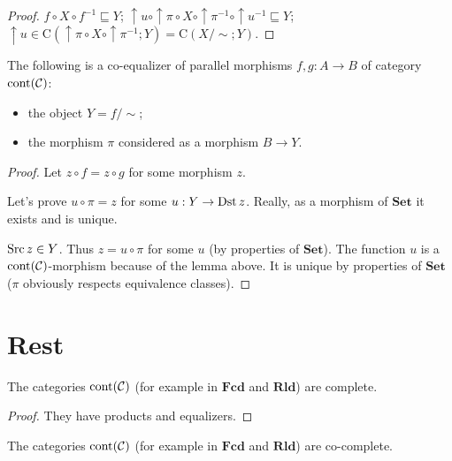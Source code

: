 \begin{proof}
  $f \circ X \circ f^{- 1} \sqsubseteq Y$; $\uparrow u \circ \uparrow \pi
  \circ X \circ \uparrow \pi^{- 1} \circ \uparrow u^{- 1} \sqsubseteq Y$;
  $\uparrow u \in \mathrm{C} (\uparrow \pi \circ X \circ \uparrow \pi^{- 1} ;
  Y) = \mathrm{C} (X / \sim ; Y)$.
\end{proof}

\begin{thm}
  The following is a co-equalizer of parallel morphisms $f, g : A \rightarrow
  B$ of category $\operatorname{cont} (\mathcal{C})$:
  \begin{itemize}
    \item the object $Y = f / \sim$;
    
    \item the morphism $\pi$ considered as a morphism $B \rightarrow Y$.
  \end{itemize}
\end{thm}

\begin{proof}
  Let $z \circ f = z \circ g$ for some morphism $z$.
  
  Let's prove $u \circ \pi = z$ for some $u : Y \rightarrow \operatorname{Dst} z$.
  Really, as a morphism of $\mathbf{Set}$ it exists and is unique.
  
  $\operatorname{Src} z \in Y$. Thus $z = u \circ \pi$ for some $u$ (by properties of
  $\mathbf{Set}$). The function $u$ is a $\operatorname{cont}
  (\mathcal{C})$-morphism because of the lemma above. It is unique by
  properties of $\mathbf{Set}$ ($\pi$ obviously respects equivalence
  classes).
\end{proof}

\section{Rest}

\begin{thm}
  The categories $\operatorname{cont} (\mathcal{C})$ (for example in
  $\mathbf{Fcd}$ and $\mathbf{Rld}$) are complete.
\end{thm}

\begin{proof}
  They have products and equalizers.
\end{proof}

\begin{thm}
  The categories $\operatorname{cont} (\mathcal{C})$ (for example in
  $\mathbf{Fcd}$ and $\mathbf{Rld}$) are co-complete.
\end{thm}

